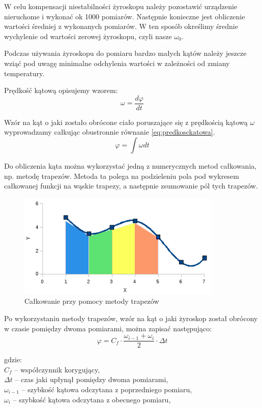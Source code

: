 W celu kompensacji niestabilności żyroskopu należy pozostawić urządzenie nieruchome i wykonać ok 1000 pomiarów. Następnie
konieczne jest obliczenie wartości średniej z wykonanych pomiarów. W ten sposób określimy średnie wychylenie od wartości
zerowej żyroskopu, czyli nasze $\omega_{0}$.

Podczas używania żyroskopu do pomiaru bardzo małych kątów należy jeszcze wziąć pod uwagę minimalne odchylenia wartości w
zależności od zmiany temperatury.

Prędkość kątową opisujemy wzorem: 
\begin{equation}
  \label{eq:predkosckatowa}
  \omega = \frac{d\varphi}{dt}
\end{equation}

Wzór na kąt o jaki zostało obrócone ciało poruszające się z prędkością kątową $\omega$ wyprowadzamy całkując obustronnie równanie \ref{eq:predkosckatowa}.
\begin{equation}
  \varphi = \int \omega dt
\end{equation}

Do obliczenia kąta można wykorzystać jedną z numerycznych metod całkowania, np. metodę trapezów. Metoda ta polega na podzieleniu pola pod wykresem całkowanej funkcji na wąskie trapezy, a następnie zsumowanie pól tych trapezów.

\begin{figure}[h!]
 \centering
 \includegraphics[height=50mm]{../images/ch04/calkowanie-metoda-trapezow.png}
 \caption{Całkowanie przy pomocy metody trapezów}
 \label{fig:CalkowanieTrapezy}
\end{figure}

Po wykorzystaniu metody trapezów, wzór na kąt o jaki żyroskop został obrócony w czasie pomiędzy dwoma pomiarami, można zapisać następująco:
\begin{equation}
  \varphi = C_{f} \cdot \frac{\omega_{i-1} + \omega_{i}}{2} \cdot \Delta t
\end{equation}
\begin{tabbing}
  gdzie: \= \\
    \> $C_{f}$ -- współczynnik korygujący, \\
    \> $\Delta t$ -- czas jaki upłynął pomiędzy dwoma pomiarami,\\
    \> $\omega_{i-1}$ -- szybkość kątowa odczytana z poprzedniego pomiaru,\\
    \> $\omega_{i}$ -- szybkość kątowa odczytana z obecnego pomiaru,\\
\end{tabbing}

